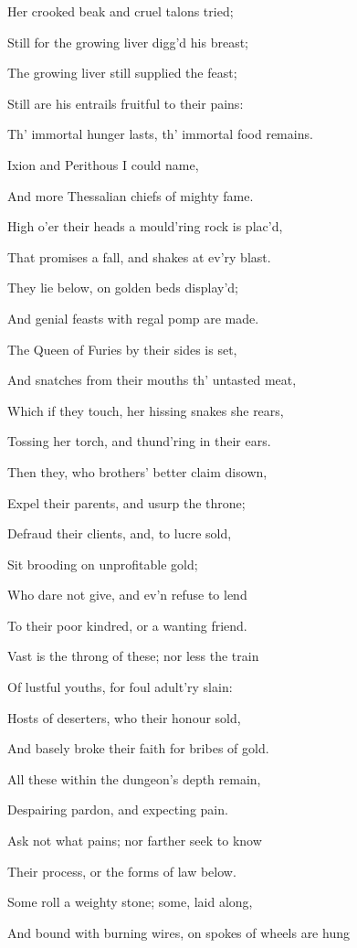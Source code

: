 Her crooked beak and cruel talons tried;

Still for the growing liver digg’d his breast;

The growing liver still supplied the feast;

Still are his entrails fruitful to their pains:

Th’ immortal hunger lasts, th’ immortal food remains.

Ixion and Perithous I could name,

And more Thessalian chiefs of mighty fame.

High o’er their heads a mould’ring rock is plac’d,

That promises a fall, and shakes at ev’ry blast.

They lie below, on golden beds display’d;

And genial feasts with regal pomp are made.

The Queen of Furies by their sides is set,

And snatches from their mouths th’ untasted meat,

Which if they touch, her hissing snakes she rears,

Tossing her torch, and thund’ring in their ears.

Then they, who brothers’ better claim disown,

Expel their parents, and usurp the throne;

Defraud their clients, and, to lucre sold,

Sit brooding on unprofitable gold;

Who dare not give, and ev’n refuse to lend

To their poor kindred, or a wanting friend.

Vast is the throng of these; nor less the train

Of lustful youths, for foul adult’ry slain:

Hosts of deserters, who their honour sold,

And basely broke their faith for bribes of gold.

All these within the dungeon’s depth remain,

Despairing pardon, and expecting pain.

Ask not what pains; nor farther seek to know

Their process, or the forms of law below.

Some roll a weighty stone; some, laid along,

And bound with burning wires, on spokes of wheels are hung

